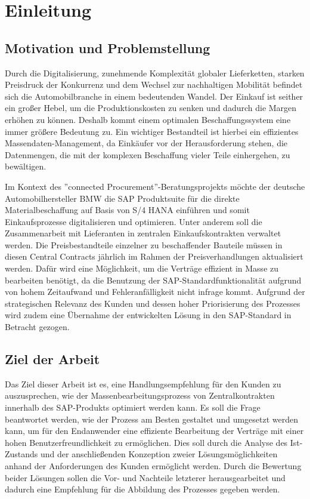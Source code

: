 \chapter{Einleitung}


\section{Motivation und Problemstellung}

Durch die Digitalisierung, zunehmende Komplexität globaler Lieferketten, starken Preisdruck der Konkurrenz und dem Wechsel zur nachhaltigen Mobilität befindet sich die Automobilbranche in einem bedeutenden Wandel. Der Einkauf ist seither ein gro\ss er Hebel, um die Produktionskosten zu senken und dadurch die Margen erhöhen zu können. Deshalb kommt einem optimalen Beschaffungssystem eine immer grö\ss ere Bedeutung zu. Ein wichtiger Bestandteil ist hierbei ein effizientes Massendaten-Management, da Einkäufer vor der Herausforderung stehen, die Datenmengen, die mit der komplexen Beschaffung vieler Teile einhergehen, zu bewältigen. 

Im Kontext des ''connected Procurement''-Beratungsprojekts möchte der deutsche Automobilhersteller BMW die SAP Produktsuite für die direkte Materialbeschaffung auf Basis von S/4 HANA einführen und somit Einkaufsprozesse digitalisieren und optimieren. Unter anderem soll die Zusammenarbeit mit Lieferanten in zentralen Einkaufskontrakten verwaltet werden. Die Preisbestandteile einzelner zu beschaffender  Bauteile müssen in diesen Central Contracts jährlich im Rahmen der Preisverhandlungen aktualisiert werden. Dafür wird eine Möglichkeit, um die Verträge effizient in Masse zu bearbeiten benötigt, da die Benutzung der SAP-Standardfunktionalität aufgrund von hohem Zeitaufwand und Fehleranfälligkeit nicht infrage kommt. Aufgrund der strategischen Relevanz des Kunden und dessen hoher Priorisierung des Prozesses wird zudem eine Übernahme der entwickelten Lösung in den SAP-Standard in Betracht gezogen.

\section{Ziel der Arbeit}

Das Ziel dieser Arbeit ist es, eine Handlungsempfehlung für den Kunden zu auszusprechen, wie der Massenbearbeitungsprozess von Zentralkontrakten innerhalb des SAP-Produkts optimiert werden kann. Es soll die Frage beantwortet werden, wie der Prozess am Besten gestaltet und umgesetzt werden kann, um für den Endanwender eine effiziente Bearbeitung der Verträge mit einer hohen Benutzerfreundlichkeit zu ermöglichen. Dies soll durch die Analyse des Ist-Zustands und der anschlie\ss enden Konzeption zweier Lösungsmöglichkeiten anhand der Anforderungen des Kunden ermöglicht werden. Durch die Bewertung beider Lösungen sollen die Vor- und Nachteile letzterer herausgearbeitet und dadurch eine Empfehlung für die Abbildung des Prozesses gegeben werden.  

